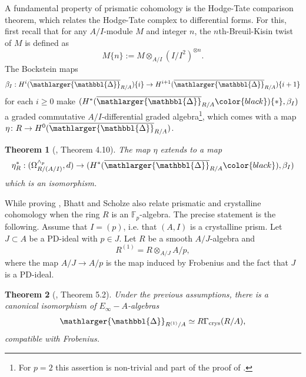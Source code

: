 \documentclass{amsart}
\newcommand{\prism}{{\mathlarger{\mathbbl{\Delta}}}}
\theoremstyle{plain}
\newtheorem{theorem}{Theorem}[subsection]
\theoremstyle{definition}
\newcommand{\F}{\mathbb{F}}
\newcommand{\red}[1]{{\color{black} #1}}
\begin{document}
A fundamental property of prismatic cohomology is the Hodge-Tate comparison theorem, which relates the Hodge-Tate complex to differential forms. For this, first recall that for any $A/I$-module $M$ and integer $n$, the $n$th-Breuil-Kisin twist of $M$ is defined as
\[ M\{n\} := M \otimes_{A/I} (I/I^2)^{\otimes n}. \]
The Bockstein maps
\[ \beta_I : H^i(\overline{\prism}_{R/A})\{i\} \to H^{i+1}(\overline{\prism}_{R/A})\{i+1\} \]
for each $i \geq 0$ make $(H^*(\overline{\prism}_{R/A}\red{)}\{*\},\beta_I)$ a graded commutative $A/I$-differential graded algebra\footnote{For $p=2$ this assertion is non-trivial and part of the proof of \cite[Theorem 4.10]{bhatt_scholze_prisms_and_prismatic_cohomology}.}, which comes with a map $\eta \colon R \to H^0(\overline{\prism}_{R/A})$. 

\begin{theorem}[\cite{bhatt_scholze_prisms_and_prismatic_cohomology}, Theorem 4.10]
\label{sec:hodge-tate-comp-smooth}
The map $\eta$ extends to a map
\[ \eta_R^* : (\Omega_{R/(A/I)}^{\wedge_p}, d) \to (H^*(\overline{\prism}_{R/A}\red{)}, \beta_I) \]  
which is an isomorphism.
\end{theorem}

While proving , Bhatt and Scholze also relate prismatic and crystalline cohomology when the ring $R$ is an $\F_p$-algebra. The precise statement is the following. Assume that $I=(p)$, i.e. that $(A,I)$ is a crystalline prism. Let $J \subset A$ be a PD-ideal with $p\in J$. Let $R$ be a smooth $A/J$-algebra and 
\[ R^{(1)} = R \otimes_{A/J} A/p, \]
where the map $A/J \to A/p$ is the map induced by Frobenius and the fact that $J$ is a PD-ideal. 

\begin{theorem}[\cite{bhatt_scholze_prisms_and_prismatic_cohomology}, Theorem 5.2]
\label{sec:crystalline-comp-smooth}
Under the previous assumptions, there is a canonical isomorphism of $E_{\infty}-A$-algebras
\[ \prism_{R^{(1)}/A} \simeq R\Gamma_{\rm crys}(R/A), \]
compatible with Frobenius.
\end{theorem}
\end{document}
